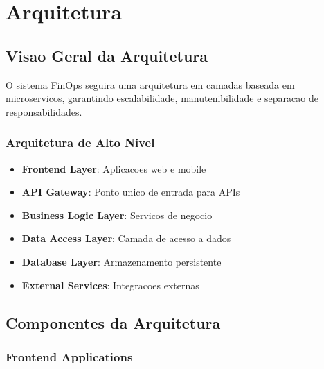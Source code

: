 \section{Arquitetura}

\subsection{Visao Geral da Arquitetura}

O sistema FinOps seguira uma arquitetura em camadas baseada em microservicos, garantindo escalabilidade, manutenibilidade e separacao de responsabilidades.

\subsubsection{Arquitetura de Alto Nivel}

\begin{itemize}
    \item \textbf{Frontend Layer}: Aplicacoes web e mobile
    \item \textbf{API Gateway}: Ponto unico de entrada para APIs
    \item \textbf{Business Logic Layer}: Servicos de negocio
    \item \textbf{Data Access Layer}: Camada de acesso a dados
    \item \textbf{Database Layer}: Armazenamento persistente
    \item \textbf{External Services}: Integracoes externas
\end{itemize}

\subsection{Componentes da Arquitetura}

\subsubsection{Frontend Applications}

